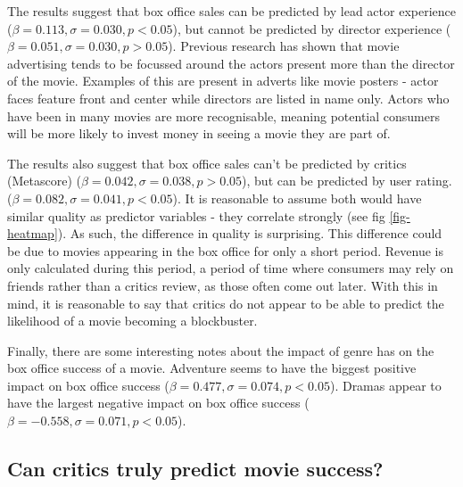            The results suggest that box office sales can be predicted by lead actor
                experience ($\beta=0.113, \sigma=0.030, p<0.05$), but cannot be predicted by
                director experience ($\beta=0.051, \sigma=0.030, p>0.05$).
            Previous research has shown that movie advertising tends to be focussed around
                the actors present more than the director of the movie\cite{elberse2007power}.
            Examples of this are present in adverts like movie posters - actor faces
                feature front and center while directors are listed in name only.
            Actors who have been in many movies are more recognisable, meaning potential
                consumers will be more likely to invest money in seeing a movie they are part
                of.

            The results also suggest that box office sales can't be predicted by critics
                (Metascore) ($\beta=0.042, \sigma=0.038, p>0.05$), but can be predicted by user
                rating.
            ($\beta=0.082, \sigma=0.041, p<0.05$).
            It is reasonable to assume both would have similar quality as predictor
                variables - they correlate strongly (see fig \ref{fig-heatmap}).
            As such, the difference in quality is surprising.
            This difference could be due to movies appearing in the box office for only a
                short period.
            Revenue is only calculated during this period, a period of time where consumers
                may rely on friends rather than a critics review, as those often come out
                later.
            With this in mind, it is reasonable to say that critics do not appear to be
                able to predict the likelihood of a movie becoming a blockbuster.

            Finally, there are some interesting notes about the impact of genre has on the
                box office success of a movie.
            Adventure seems to have the biggest positive impact on box office success
                ($\beta=0.477,\sigma=0.074,p<0.05$).
            Dramas appear to have the largest negative impact on box office success
                ($\beta=-0.558,\sigma=0.071,p<0.05$).
    \subsection{Can critics truly predict movie success?}
